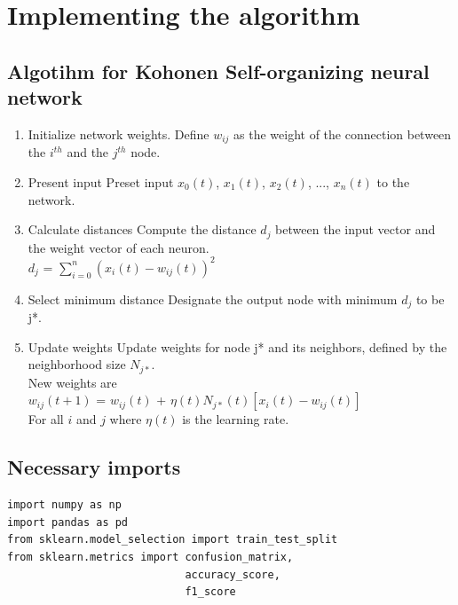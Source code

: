 \section{Implementing the algorithm}
\subsection{Algotihm for Kohonen Self-organizing neural network}
\begin{enumerate}
    \item Initialize network weights.
    Define $w_{ij}$ as the weight of the connection between the $i^{th}$ and the $j^{th}$ node.\\
    \item Present input
    Preset input $x_0(t)$, $x_1(t)$, $x_2(t)$, ..., $x_n(t)$ to the network.\\
    \item Calculate distances
    Compute the distance $d_j$ between the input vector and the weight vector of each neuron.\\
    $d_j$ = $\sum_{i=0}^{n}(x_i(t)-w_{ij}(t))^2$\\
    \item Select minimum distance
    Designate the output node with minimum $d_j$ to be j*.\\
    \item Update weights
    Update weights for node j* and its neighbors, defined by the neighborhood size $N_{j*}$.\\
    New weights are\\
    $w_{ij}(t+1)$ = $w_{ij}(t)$ + $\eta(t)N_{j*}(t)[x_i(t)-w_{ij}(t)]$\\
    For all $i$ and $j$
    where $\eta(t)$ is the learning rate.\\
\end{enumerate}
\subsection{Necessary imports}
\begin{verbatim}
import numpy as np
import pandas as pd
from sklearn.model_selection import train_test_split
from sklearn.metrics import confusion_matrix, 
                            accuracy_score, 
                            f1_score
\end{verbatim}
